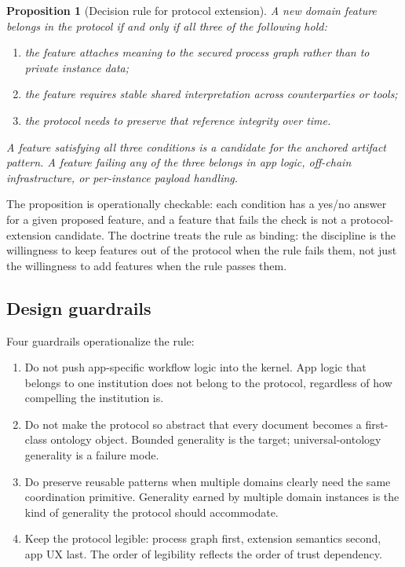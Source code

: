 \documentclass[11pt,a4paper]{article}
\newtheorem{proposition}[theorem]{Proposition}
\theoremstyle{definition}
\theoremstyle{remark}
\begin{document}
\begin{proposition}[Decision rule for protocol extension]
\label{prop:decision-rule}
A new domain feature belongs in the protocol if and only if all
three of the following hold:
\begin{enumerate}[label=(\arabic*)]
  \item the feature attaches meaning to the secured process graph
    rather than to private instance data;
  \item the feature requires stable shared interpretation across
    counterparties or tools;
  \item the protocol needs to preserve that reference integrity over
    time.
\end{enumerate}
A feature satisfying all three conditions is a candidate for the
anchored artifact pattern. A feature failing any of the three
belongs in app logic, off-chain infrastructure, or per-instance
payload handling.
\end{proposition}

The proposition is operationally checkable: each condition has a
yes/no answer for a given proposed feature, and a feature that fails
the check is not a protocol-extension candidate. The doctrine
treats the rule as binding: the discipline is the willingness to
keep features out of the protocol when the rule fails them, not just
the willingness to add features when the rule passes them.

\subsection{Design guardrails}

Four guardrails operationalize the rule:

\begin{enumerate}
  \item Do not push app-specific workflow logic into the kernel.
    App logic that belongs to one institution does not belong to the
    protocol, regardless of how compelling the institution is.
  \item Do not make the protocol so abstract that every document
    becomes a first-class ontology object. Bounded generality is the
    target; universal-ontology generality is a failure mode.
  \item Do preserve reusable patterns when multiple domains clearly
    need the same coordination primitive. Generality earned by
    multiple domain instances is the kind of generality the protocol
    should accommodate.
  \item Keep the protocol legible: process graph first, extension
    semantics second, app UX last. The order of legibility reflects
    the order of trust dependency.
\end{enumerate}
\end{document}
